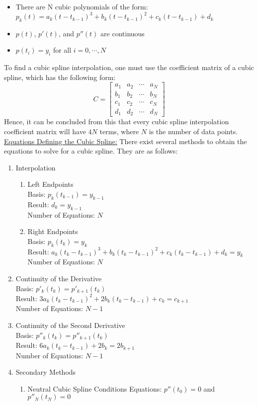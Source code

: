 \documentclass{article}
\newcommand{\gap}{\medskip\\}
\begin{document}
\begin{itemize}
    \item There are N cubic polynomials of the form:\\
    $
        p_k(t) = a_k(t - t_{k-1})^3 + b_k(t - t_{k-1})^2 + c_k(t - t_{k - 1}) + d_k    
    $
    \item $p(t)$, $p'(t)$, and $p''(t)$ are continuous
    \item $p(t_i) = y_i$ for all $i = 0, \cdots, N$
\end{itemize}
To find a cubic spline interpolation, one must use the coefficient matrix of a cubic
spline, which has the following form:
\[
    C = \begin{bmatrix}
        a_1 & a_2 & \cdots & a_N\\
        b_1 & b_2 & \cdots & b_N\\
        c_1 & c_2 & \cdots & c_N\\
        d_1 & d_2 & \cdots & d_N
    \end{bmatrix}    
\]
Hence, it can be concluded from this that every cubic spline interpolation coefficient
matrix will have $4N$ terms, where $N$ is the number of data points.
\gap
\underline{Equations Defining the Cubic Spline:} There exist several methods to obtain
the equations to solve for a cubic spline. They are as follows:
\begin{enumerate}
    \item Interpolation
    \begin{enumerate}
        \item Left Endpoints\\
        Basis: $p_k(t_{k-1}) = y_{k-1}$\\
        Result: $d_k = y_{k - 1}$\\
        Number of Equations: $N$
        \item Right Endpoints\\
        Basis: $p_k(t_k) = y_{k}$\\
        Result: $a_k(t_k - t_{k-1})^3 + b_k(t_k - t_{k-1})^2 + c_k(t_k - t_{k - 1}) + d_k = y_k$\\
        Number of Equations: $N$
    \end{enumerate}
    \item Continuity of the Derivative\\
    Basis: $p'_k(t_k) = p'_{k+1}(t_k)$\\
    Result: $3a_k(t_k - t_{k-1})^2 + 2b_k(t_k - t_{k - 1}) + c_k = c_{k + 1}$\\
    Number of Equations: $N-1$
    \item Continuity of the Second Derivative\\
    Basis: $p''_k(t_k) = p''_{k+1}(t_k)$\\
    Result: $6a_k(t_k - t_{k - 1}) + 2b_k = 2b_{k + 1}$\\
    Number of Equations: $N-1$
    \item Secondary Methods
    \begin{enumerate}
        \item Neutral Cubic Spline Conditions
        Equations: $p''(t_0) = 0$ and $p''_N(t_N) = 0$
    \end{enumerate}
\end{enumerate}
\end{document}
